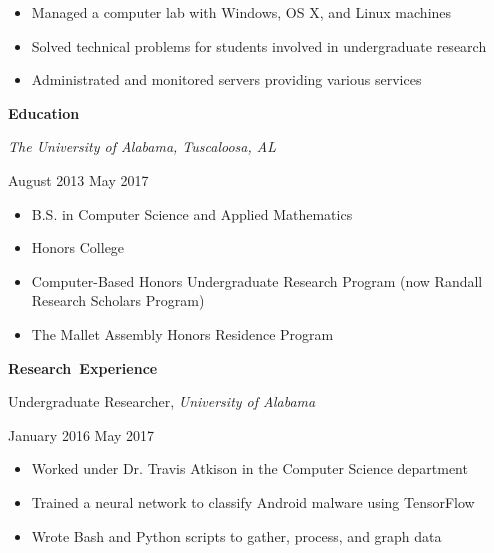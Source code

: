 \documentclass[11pt]{article}
\begin{document}
\begin{itemize}
  \item Managed a computer lab with Windows, OS X, and Linux machines
  \item Solved technical problems for students involved in undergraduate research
  \item Administrated and monitored servers providing various services
\end{itemize}

\vspace{0.8em}
\hbox{\large \textbf{Education}}

\begin{minipage}[t]{0.65\textwidth}
\flushleft
\textit{The University of Alabama, Tuscaloosa, AL}\\
\end{minipage}
\begin{minipage}[t]{0.30\textwidth}
\flushright
August 2013 \space \textemdash \space May 2017\\
\end{minipage}

\begin{itemize}
  \item B.S. in Computer Science and Applied Mathematics
  \item Honors College
  \item Computer-Based Honors Undergraduate Research Program (now Randall Research Scholars Program)
  \item The Mallet Assembly Honors Residence Program
\end{itemize}

\vspace{0.8em}
\hbox{\large \textbf{Research Experience}}

\vspace{0.4em}
\begin{minipage}[t]{0.65\textwidth}
\flushleft
Undergraduate Researcher, \textit{University of Alabama}\\
\end{minipage}
\begin{minipage}[t]{0.30\textwidth}
\flushright
January 2016 \space \textemdash \space May 2017\\
\end{minipage}

\begin{itemize}
  \item Worked under Dr. Travis Atkison in the Computer Science department
  \item Trained a neural network to classify Android malware using TensorFlow
  \item Wrote Bash and Python scripts to gather, process, and graph data
\end{itemize}
\end{document}
